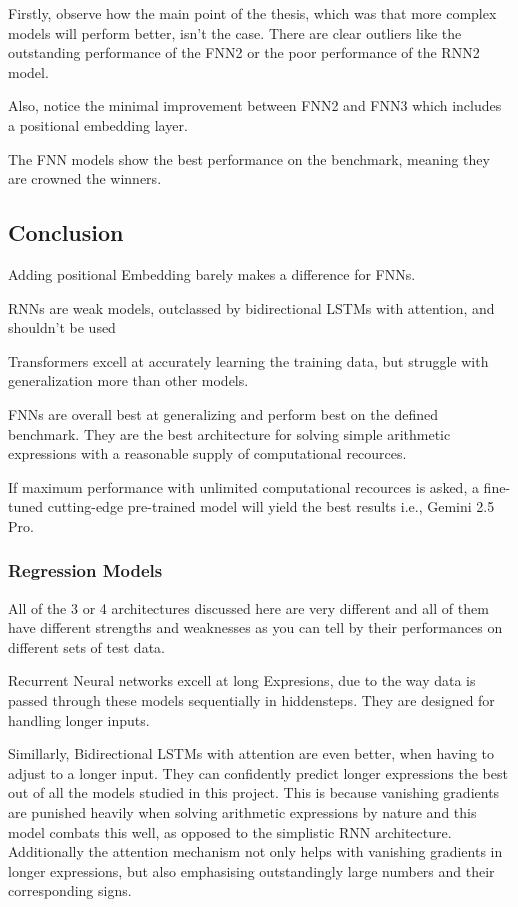 \documentclass{article}
\begin{document}
Firstly, observe how the main point of the thesis, which was that more complex 
models will perform better, isn't the case. There are clear outliers like the 
outstanding performance of the FNN2 or the poor performance of the RNN2 model.

Also, notice the minimal improvement between FNN2 and FNN3 which includes a 
positional embedding layer.

The FNN models show the best performance on the benchmark, meaning they are 
crowned the winners.

\subsection{Conclusion}

Adding positional Embedding barely makes a difference for FNNs.

RNNs are weak models, outclassed by bidirectional LSTMs with attention, and 
shouldn't be used

Transformers excell at accurately learning the training data, but struggle with 
generalization more than other models.

FNNs are overall best at generalizing and perform best on the defined benchmark. 
They are the best architecture for solving simple arithmetic expressions with 
a reasonable supply of computational recources.

If maximum performance with unlimited computational recources is asked, a 
fine-tuned cutting-edge pre-trained model will yield  the best results i.e., 
Gemini 2.5 Pro.

\subsubsection{Regression Models}
All of the 3 or 4 architectures discussed here are very different and all of 
them have different strengths and weaknesses as you can tell by their 
performances on different sets of test data.

Recurrent Neural networks excell at long Expresions, due to the way data is 
passed through these models sequentially in hiddensteps. They are designed for 
handling longer inputs.

Simillarly, Bidirectional LSTMs with attention are even better, when having to 
adjust to a longer input. They can confidently predict longer expressions the 
best out of all the models studied in this project. This is because vanishing 
gradients are punished heavily when solving arithmetic expressions by nature and 
this model combats this well, as opposed to the simplistic RNN architecture. 
Additionally the attention mechanism not only helps with vanishing gradients in 
longer expressions, but also emphasising outstandingly large numbers and their 
corresponding signs.
\end{document}
